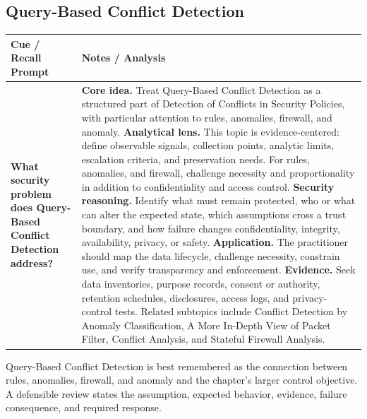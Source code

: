 \documentclass[11pt]{article}
\newcommand{\CornellHeader}{%
\rowcolor{Navy}\color{white}\bfseries Cue / Recall Prompt & \color{white}\bfseries Notes / Analysis\\\hline}
\newcommand{\CornellRow}[2]{%
\cellcolor{CueGray}\RaggedRight\textbf{#1} & \RaggedRight #2\\\hline}
\begin{document}
\subsection*{Query-Based Conflict Detection}
\begin{longtable}{>{\RaggedRight\arraybackslash}p{}|>{\RaggedRight\arraybackslash}p{}}
\CornellHeader
\CornellRow{What security problem does Query-Based Conflict Detection address?}{\textbf{Core idea.} Treat Query-Based Conflict Detection as a structured part of Detection of Conflicts in Security Policies, with particular attention to rules, anomalies, firewall, and anomaly. \textbf{Analytical lens.} This topic is evidence-centered: define observable signals, collection points, analytic limits, escalation criteria, and preservation needs. For rules, anomalies, and firewall, challenge necessity and proportionality in addition to confidentiality and access control. \textbf{Security reasoning.} Identify what must remain protected, who or what can alter the expected state, which assumptions cross a trust boundary, and how failure changes confidentiality, integrity, availability, privacy, or safety. \textbf{Application.} The practitioner should map the data lifecycle, challenge necessity, constrain use, and verify transparency and enforcement. \textbf{Evidence.} Seek data inventories, purpose records, consent or authority, retention schedules, disclosures, access logs, and privacy-control tests. Related subtopics include Conflict Detection by Anomaly Classification, A More In-Depth View of Packet Filter, Conflict Analysis, and Stateful Firewall Analysis.}
\end{longtable}
\begin{topicsummary}
Query-Based Conflict Detection is best remembered as the connection between rules, anomalies, firewall, and anomaly and the chapter's larger control objective. A defensible review states the assumption, expected behavior, evidence, failure consequence, and required response.
\end{topicsummary}
\end{document}

